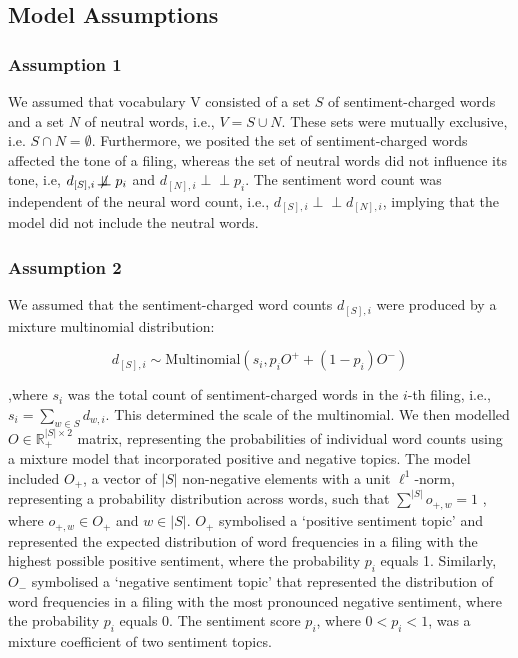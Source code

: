 \documentclass[logo,bsc,singlespacing,parskip]{infthesis}
\begin{document}
\subsection{Model Assumptions}
\subsubsection{Assumption 1}
We assumed that vocabulary V consisted of a set $S$ of sentiment-charged words and a set $N$ of neutral words, i.e., $V = S \cup N$. These sets were mutually exclusive, i.e. $S \cap N = \emptyset
$. Furthermore, we posited the set of sentiment-charged words affected the tone of a filing, whereas the set of neutral words did not influence its tone, i.e, $ d_{[S], i} \not\!\perp\!\!\!\perp
 p_i$ and $ d_{[N], i} \perp \!\!\! \perp p_i$. The sentiment word count was independent of the neural word count, i.e., $d_{[S], i} \perp \!\!\! \perp d_{[N], i}$, implying that the model did not include the neutral words. 
\subsubsection{Assumption 2}
\label{subsubsec:assumption2}
We assumed that the sentiment-charged word counts $d_{[S],i}$ were produced by a mixture multinomial distribution: 

\begin{equation} \label{eu_eqn}
d_{[S],i} \sim \text{Multinomial} \left( s_{i}, p_{i}O^{+} + (1 - p_{i})O^{-} \right)
\end{equation}

,where $s_i$ was the total count of sentiment-charged words in the $i$-th filing, i.e., $s_i = \sum_{w \in S} d_{w,i}$. This determined the scale of the multinomial. We then modelled $O \in \mathbb{R}^{|S| \times 2}_+$ matrix, representing the probabilities of individual word counts using a mixture model that incorporated positive and negative topics. The model included $O_+$, a vector of $|S|$ non-negative elements with a unit $\ell^1$-norm, representing a probability distribution across words, such that $\sum_{}^{|S|} o_{+,w} = 1$
, where $o_{+,w} \in O_+$ and  $w \in |S|$. $O_+$  symbolised a ‘positive sentiment topic’ and represented the expected distribution of word frequencies in a filing with the highest possible positive sentiment, where the probability $p_i$ equals 1. Similarly, $O_-$ symbolised a ‘negative sentiment topic’ that represented the distribution of word frequencies in a filing with the most pronounced negative sentiment, where the probability $p_i$ equals 0. The sentiment score $p_i$, where $0 < p_i <1$, was a mixture coefficient of two sentiment topics.
\end{document}
